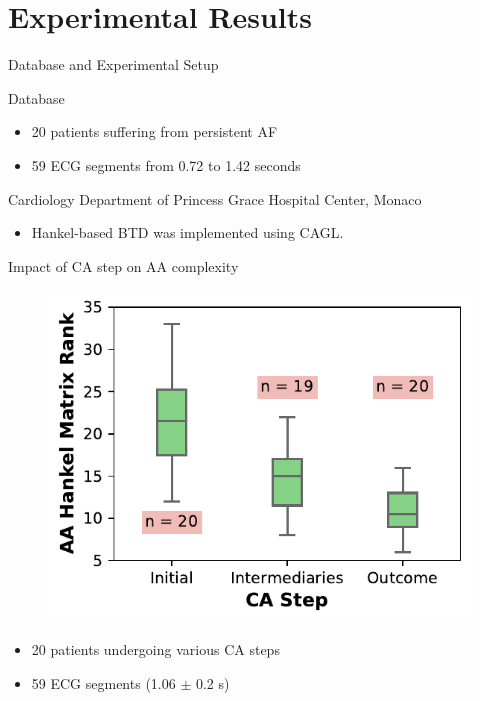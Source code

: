 \documentclass{beamer}
\begin{document}
\section{Experimental Results}

	\begin{frame}{Database and Experimental Setup} 
			
		\begin{block}{Database}
			\begin{itemize}
				\item 20 patients suffering from persistent AF
				\item 59 ECG segments from 0.72 to 1.42 seconds
			\end{itemize}
			
			\begin{center}
				Cardiology Department of Princess Grace Hospital Center, Monaco
			\end{center}					
		\end{block}	
		
		\begin{itemize}
			\item Hankel-based BTD was implemented using CAGL.
		\end{itemize}
	\end{frame}

	\begin{frame}{Impact of CA step on AA complexity}
		
		\vspace{-0.5cm}
		\begin{figure}[h]
			\centering
			\includegraphics[scale=0.9]{figures/boxplot_complexity.pdf}
		\end{figure}
		\vspace{-0.5cm}
		\begin{itemize}
			\item 20 patients undergoing various CA steps
			\item 59 ECG segments (1.06 $\pm$ 0.2 s)
		\end{itemize}
	\end{frame}
\end{document}
